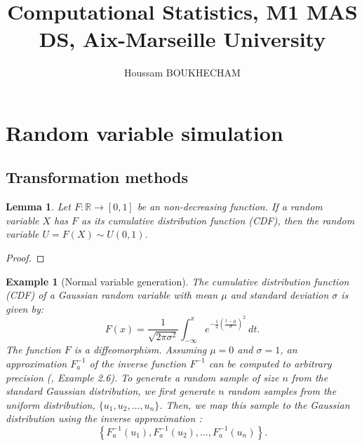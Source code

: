 \documentclass{article}\usepackage[]{graphicx}\usepackage[]{xcolor}
\title{Computational Statistics, M1 MAS DS, Aix-Marseille University}
\author{Houssam BOUKHECHAM}
\newtheorem{lemma}{Lemma}
\newtheorem{example}{Example}
\begin{document}
\maketitle
\tableofcontents


\newpage
\section{Random variable simulation}

\cite{RobertCasela1999MonteCarloSM, gentle2009computational, tokdar2010importance}

\subsection{Transformation methods}

\begin{lemma}
  Let $F:\mathbb{R} \to [0,1]$ be an non-decreasing function. 
  If a random variable $X$ has $F$ as its cumulative distribution function (CDF), then the random variable $U = F(X) \sim U(0,1)$.
\end{lemma}
  
\begin{proof}
\end{proof}


\begin{example}[Normal variable generation]

  The cumulative distribution function (CDF) of a Gaussian random variable with mean $\mu$ and standard deviation $\sigma$ is given by:  
  \begin{equation}\label{CDF of a Gaussian(mu,sigma)}
  F(x) = \frac{1}{\sqrt{2\pi\sigma^2}} \int_{-\infty}^x e^{-\frac{1}{2}\left(\frac{t-\mu}{\sigma}\right)^2}~dt.
  \end{equation}  
  The function $F$ is a diffeomorphism. Assuming $\mu = 0$ and $\sigma = 1$, an approximation $F_a^{-1}$ of the inverse function $F^{-1}$ can be computed to arbitrary precision (\cite{see RC MCSM}, Example 2.6). To generate a random sample of size $n$ from the standard Gaussian distribution, we first generate $n$ random samples from the uniform distribution, $\{u_1, u_2, \ldots, u_n\}$. Then, we map this sample to the Gaussian distribution using the inverse approximation :  
  \[
  \left\{F_a^{-1}(u_1), F_a^{-1}(u_2), \ldots, F_a^{-1}(u_n)\right\}.
  \]
  
  \end{example}
  
\end{document}
